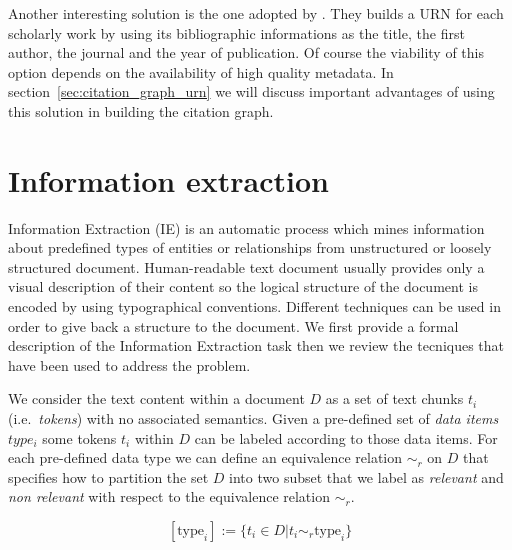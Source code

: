 Another interesting solution is the one adopted by \cite{bergmark2000aer}. They builds a URN for each scholarly work by using its bibliographic informations as the title, the first author, the journal and the year of publication. Of course the viability of this option depends on the availability of high quality metadata. In section~\ref{sec:citation_graph_urn} we will discuss important advantages of using this solution in building the citation graph.

\section{Information extraction}\label{sec:information_extraction}
Information Extraction (IE) is an automatic process which mines information about predefined types of entities or relationships from unstructured or loosely structured document. Human-readable text document usually provides only a visual description of their content so the logical structure of the document is encoded by using typographical conventions. Different techniques can be used in order to give back a structure to the document. We first provide a formal description of the Information Extraction task then we review the tecniques that have been used to address the problem.

We consider the text content within a document $D$ as a set of text chunks $t_i$ (i.e.\ \emph{tokens}) with no associated semantics. Given a pre-defined set of \emph{data items} $type_i$ some tokens $t_i$ within $D$ can be labeled according to those data items. For each pre-defined data type we can define an equivalence relation $\sim_r$ on $D$ that specifies how to partition the set $D$ into two subset that we label as \emph{relevant} and \emph{non relevant} with respect to the equivalence relation $\sim_r$.

\begin{equation}\label{eq:equivalence_relation}
 [\mbox{type}_i] := \{t_i \in D | t_i \sim_r \mbox{type}_i\}
\end{equation}

